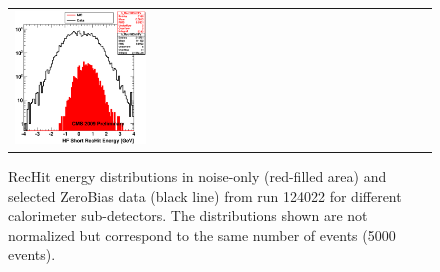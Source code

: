 \begin{figure}[h!]
\begin{tabular}{ll}
  \includegraphics[width=0.33\textwidth]{plots_CaloNoise/h_RecHitEinHFs.eps} \\
 \end{tabular}
 \caption{\small RecHit energy distributions in noise-only (red-filled area) and selected ZeroBias data (black line) from
run 124022 for different calorimeter sub-detectors. The distributions shown are not normalized but correspond to the same number of events 
(5000 events).\label{fig:subdet_RecHitE}}
\end{figure}

